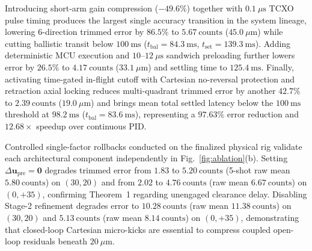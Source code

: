 \documentclass[journal]{IEEEtran}
\begin{document}
Introducing short-arm gain compression ($-49.6\%$) together with $0.1\ \mu\text{s}$ TCXO pulse timing produces the largest single accuracy transition in the system lineage, lowering 6-direction trimmed error by $86.5\%$ to $5.67\ \text{counts}$ ($45.0\ \mu\text{m}$) while cutting ballistic transit below $100\ \text{ms}$ ($t_{\text{bal}} = 84.3\ \text{ms}$, $t_{\text{set}} = 139.3\ \text{ms}$). Adding deterministic MCU execution and $10\text{--}12\ \mu\text{s}$ sandwich preloading further lowers error by $26.5\%$ to $4.17\ \text{counts}$ ($33.1\ \mu\text{m}$) and settling time to $125.4\ \text{ms}$. Finally, activating time-gated in-flight cutoff with Cartesian no-reversal protection and retraction axial locking reduces multi-quadrant trimmed error by another $42.7\%$ to $2.39\ \text{counts}$ ($19.0\ \mu\text{m}$) and brings mean total settled latency below the $100\ \text{ms}$ threshold at $98.2\ \text{ms}$ ($t_{\text{bal}} = 83.6\ \text{ms}$), representing a $97.63\%$ error reduction and $12.68\times$ speedup over continuous PID.

Controlled single-factor rollbacks conducted on the finalized physical rig validate each architectural component independently in Fig.~\ref{fig:ablation}(b). Setting $\Delta\mathbf{u}_{\text{pre}} = \mathbf{0}$ degrades trimmed error from $1.83$ to $5.20\ \text{counts}$ (5-shot raw mean $5.80\ \text{counts}$) on $(30, 20)$ and from $2.02$ to $4.76\ \text{counts}$ (raw mean $6.67\ \text{counts}$) on $(0, +35)$, confirming Theorem~1 regarding unengaged clearance delay. Disabling Stage-2 refinement degrades error to $10.28\ \text{counts}$ (raw mean $11.38\ \text{counts}$) on $(30, 20)$ and $5.13\ \text{counts}$ (raw mean $8.14\ \text{counts}$) on $(0, +35)$, demonstrating that closed-loop Cartesian micro-kicks are essential to compress coupled open-loop residuals beneath $20\ \mu\text{m}$.
\end{document}
